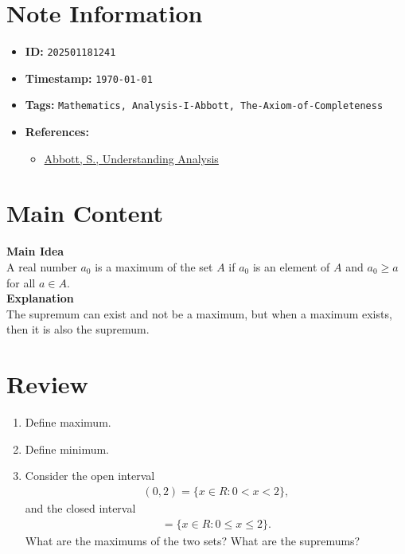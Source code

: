 \clearpage
{}
\label{202501181241}
\renewcommand{\notetitle}{Maximum and Minimum}

\section*{Note Information}
\begin{itemize}
  \item \textbf{ID:} \texttt{202501181241}
  \item \textbf{Timestamp:} \texttt{\today \ \currenttime}
  \item \textbf{Tags:} \texttt{Mathematics, Analysis-I-Abbott, The-Axiom-of-Completeness}
  \item \textbf{References:}
    \begin{itemize}
      \item \href{/home/garrett/Personal/References/Mathematics/Analysis-I/Abbott.pdf}{Abbott, S., Understanding Analysis}
    \end{itemize}
\end{itemize}


\section*{Main Content}
\textbf{Main Idea}\\
A real number $a_0$ is a maximum of the set $A$ if $a_0$ is an element of $A$ and $a_0 \geq a$ for all $a \in A$.\\

\textbf{Explanation}\\
The supremum can exist and not be a maximum, but when a maximum exists, then it is also the supremum. \\


\section*{Review}
\begin{enumerate}
  \item Define maximum.
  \item Define minimum.
  \item Consider the open interval 
    \begin{align*}
      (0,2) = \{ x \in R : 0 < x < 2 \},
    \end{align*}
    and the closed interval
    \begin{align*}
      [0,2] = \{ x \in R : 0 \leq x \leq 2 \}.
    \end{align*}
    What are the maximums of the two sets? What are the supremums?
\end{enumerate}


